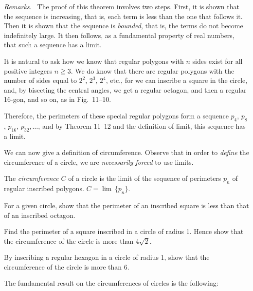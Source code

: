 \documentclass[11pt]{book}
\theoremstyle{bkplain}
\theoremstyle{XIplainnote}
\theoremstyle{bkplain}
\newenvironment{XIremarks}{\par\medskip\noindent\emph{Remarks.}\ }%
  {\par\medskip}
\newcommand{\XIgeqq}{\geqq}
\theoremstyle{bkplain}
\begin{document}
\begin{XIremarks}
The proof of this theorem involves two steps. First, it is shown that the
sequence is increasing, that is, each term is less than the one that follows
it. Then it is shown that the sequence is \emph{bounded}, that is, the terms do
not become indefinitely large. It then follows, as a fundamental property of
real numbers, that such a sequence has a limit.
\end{XIremarks}

It is natural to ask how we know that regular polygons with $n$ sides exist for
all positive integers $n \XIgeqq 3$. We do know that there are regular polygons
with the number of sides equal to $2^2$, $2^3$, $2^4$, etc., for we can
inscribe a square in the circle, and, by bisecting the central angles, we get a
regular octagon, and then a regular 16-gon, and so on, as in Fig.~11--10.

\FIGXITEN

Therefore, the perimeters of these special regular polygons form a sequence
$p_4$, $p_8$, $p_{16}$, $p_{32},\ldots$, and by Theorem 11--12 and the
definition of limit, this sequence has a limit.

We can now give a definition of circumference. Observe that in order to
\emph{define} the circumference of a circle, we are \emph{necessarily forced}
to use limits.

\begin{definition}
The \emph{circumference $C$} of a circle is the limit of the sequence of
perimeters $p_n$ of regular inscribed polygons. $C = \lim\,\{p_n\}$.
\end{definition}

\begin{exercisecols}
\begin{exlist}
\item For a given circle, show that the perimeter of an inscribed square is
      less than that of an inscribed octagon.
\item Find the perimeter of a square inscribed in a circle of radius 1. Hence
      show that the circumference of the circle is more than $4\sqrt{2}$.
\item By inscribing a regular hexagon in a circle of radius 1, show that the
      circumference of the circle is more than 6.
\end{exlist}
\end{exercisecols}

The fundamental result on the circumferences of circles is the following:
\end{document}
